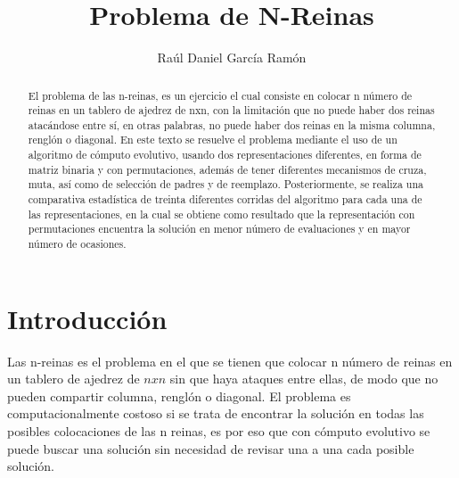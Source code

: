 \documentclass[runningheads]{llncs}
\begin{document}
%
\title{Problema de N-Reinas}
%
%
\author{Raúl Daniel García Ramón}
%

%
%
\maketitle              %
%
\begin{abstract}
El problema de las n-reinas, es un ejercicio el cual consiste en colocar n número de reinas en un tablero de ajedrez de nxn, con la limitación que no puede haber dos reinas atacándose entre sí, en otras palabras, no puede haber dos reinas en la misma columna, renglón o diagonal. En este texto se resuelve el problema mediante el uso de un algoritmo de cómputo evolutivo, usando dos representaciones diferentes, en forma de matriz binaria y con permutaciones, además de tener diferentes mecanismos de cruza, muta, así como de selección de padres y de reemplazo. Posteriormente, se realiza una comparativa estadística de treinta diferentes corridas del algoritmo para cada una de las representaciones, en la cual se obtiene como resultado que la representación con permutaciones encuentra la solución en menor número de evaluaciones y en mayor número de ocasiones.

\end{abstract}
%
%
%
\section{Introducción}
Las n-reinas es el problema en el que se tienen que colocar n número de reinas en un tablero de ajedrez de $nxn$ sin que haya ataques entre ellas, de modo que no pueden compartir columna, renglón o diagonal. El problema es computacionalmente costoso si se trata de encontrar la solución en todas las posibles colocaciones de las n reinas, es por eso que con cómputo evolutivo se puede buscar una solución sin necesidad de revisar una a una cada posible solución.
\end{document}
